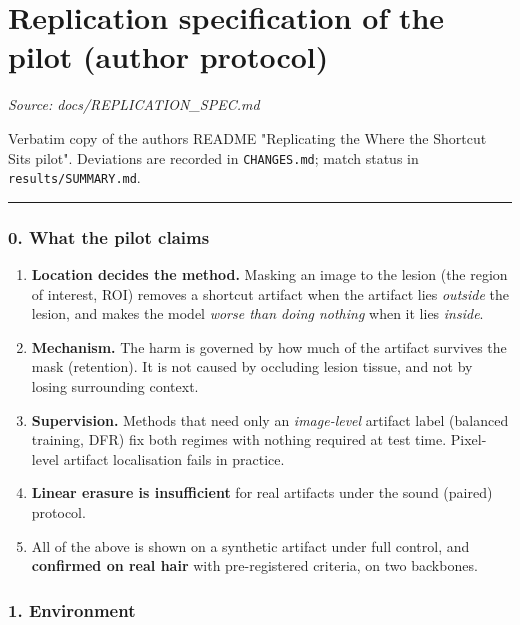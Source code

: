 \section{Replication specification of the pilot (author protocol)}\label{doc:REPLICATION_SPEC}
\noindent\textit{Source: docs/REPLICATION\_SPEC.md}

{\small
Verbatim copy of the author\textquotesingle s README "Replicating the \textquotesingle Where the Shortcut Sits\textquotesingle{} pilot". Deviations are
recorded in \texttt{CHANGES.md}; match status in \texttt{results/SUMMARY.md}.

\begin{center}\rule{0.5\linewidth}{0.5pt}\end{center}

\subsubsection{0. What the pilot claims}\label{0-what-the-pilot-claims}

\begin{enumerate}
\def\labelenumi{\arabic{enumi}.}

\item
  \textbf{Location decides the method.} Masking an image to the lesion (the region of interest, ROI) removes a shortcut artifact when the artifact lies \emph{outside} the lesion, and makes the model \emph{worse than doing nothing} when it lies \emph{inside}.
\item
  \textbf{Mechanism.} The harm is governed by how much of the artifact survives the mask (retention). It is not caused by occluding lesion tissue, and not by losing surrounding context.
\item
  \textbf{Supervision.} Methods that need only an \emph{image-level} artifact label (balanced training, DFR) fix both regimes with nothing required at test time. Pixel-level artifact localisation fails in practice.
\item
  \textbf{Linear erasure is insufficient} for real artifacts under the sound (paired) protocol.
\item
  All of the above is shown on a synthetic artifact under full control, and \textbf{confirmed on real hair} with pre-registered criteria, on two backbones.
\end{enumerate}

\subsubsection{1. Environment}\label{1-environment}

}
